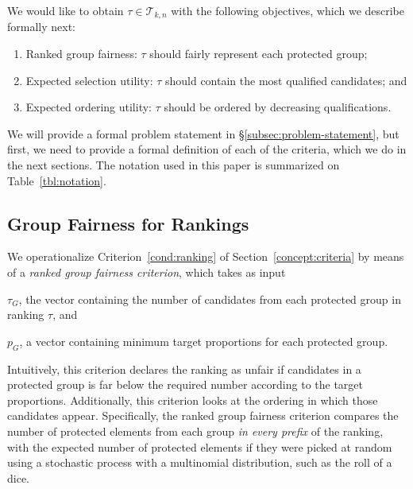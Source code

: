\label{concept:criteria}
We would like to obtain $\tau \in {\mathcal T}_{k,n}$ with the following objectives, which we describe formally next: %

\begin{enumerate}[{Criterion} 1.]
	\item Ranked group fairness: $\tau$ should fairly represent each protected group; \label{cond:ranking}

	\item Expected selection utility: $\tau$ should contain the most qualified candidates; and \label{cond:selection}

	\item Expected ordering utility: $\tau$ should be ordered by decreasing qualifications.\label{cond:ordering}
\end{enumerate}

We will provide a formal problem statement in \S\ref{subsec:problem-statement}, but first, we need to provide a formal definition of each of the criteria, which we do in the next sections.
\textcolor[rgb]{0.00,0.00,1.00}{The notation used in this paper is summarized on Table~\ref{tbl:notation}.}


\subsection{Group Fairness for Rankings}
\label{subsec:group-fairness}

We operationalize Criterion~\ref{cond:ranking} of Section~\ref{concept:criteria} by means of a \emph{ranked group fairness criterion}, which takes as input
\begin{inparaenum}[(i)]
	\item $ \tau_G $, the vector containing the number of candidates from each protected group in ranking $ \tau $, and
	\item $ p_G $, a vector containing minimum target proportions for each protected group.
\end{inparaenum}
Intuitively, this criterion declares the ranking as unfair if candidates in a protected group is far below the required number according to the target proportions.
%
Additionally, this criterion looks at the ordering in which those candidates appear.
%
Specifically, the ranked group fairness criterion compares the number of protected elements from each group \emph{in every prefix} of the ranking, with the expected number of protected elements if they were picked at random using a stochastic process with a multinomial distribution, such as the roll of a dice.

